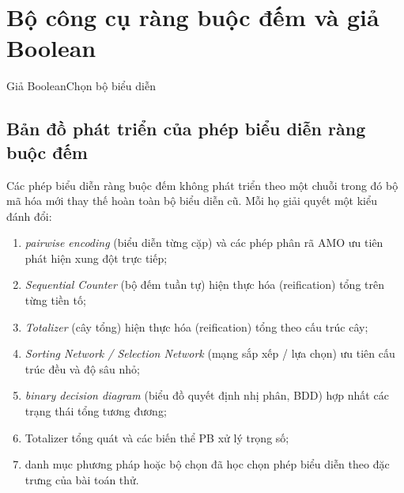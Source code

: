 \chapter{Bộ công cụ ràng buộc đếm và giả Boolean}


  {Giả Boolean}{Chọn bộ biểu diễn}

\section{Bản đồ phát triển của phép biểu diễn ràng buộc đếm}

Các phép biểu diễn ràng buộc đếm không phát triển theo một chuỗi trong đó bộ mã
hóa mới thay thế hoàn toàn bộ biểu diễn cũ. Mỗi họ giải quyết một kiểu đánh đổi:
\begin{enumerate}
  \item \emph{pairwise encoding} (biểu diễn từng cặp) và các phép phân rã AMO ưu tiên
        phát hiện xung đột trực tiếp;
  \item \emph{Sequential Counter} (bộ đếm tuần tự) hiện thực hóa (reification) tổng trên từng tiền tố;
  \item \emph{Totalizer} (cây tổng) hiện thực hóa (reification) tổng theo cấu trúc cây;
  \item \emph{Sorting Network / Selection Network} (mạng sắp xếp / lựa chọn) ưu tiên cấu
        trúc đều và độ sâu nhỏ;
  \item \emph{binary decision diagram} (biểu đồ quyết định nhị phân, BDD)
        hợp nhất các trạng thái tổng tương đương;
  \item Totalizer tổng quát và các biến thể PB xử lý trọng số;
  \item danh mục phương pháp hoặc bộ chọn đã học chọn phép biểu diễn theo đặc
        trưng của bài toán thử.
\end{enumerate}

